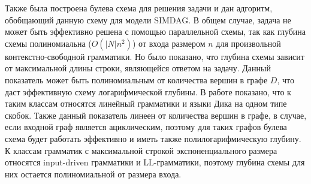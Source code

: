 Также была построена булева схема для решения задачи и дан адгоритм, обобщающий данную схему для модели SIMDAG. В общем случае, задача не может быть эффективно решена с помощью параллельной схемы, так как глубина схемы полиномиальна ($O(|N|n^2)$) от входа размером $n$ для произвольной контекстно-свободной грамматики. Но было показано, что глубина схемы зависит от максимальной длины строки, являющейся ответом на задачу. Данный показатель может быть полиномиальным от количества вершин в графе $D$, что даст эффективную схему логарифмической глубины. В работе показано, что к таким классам относятся линейный грамматики и языки Дика на одном типе скобок. Также данный показатель линеен от количества вершин в графе, в случае, если входной граф является ациклическим, поэтому для таких графов булева схема будет работать эффективно и иметь также полилогарифмическую глубину. К классам грамматик с максимальной строкой экспоненциального размера относятся input-driven грамматики и LL-грамматики, поэтому глубина схемы для них остается полиномиальной от размера входа.



